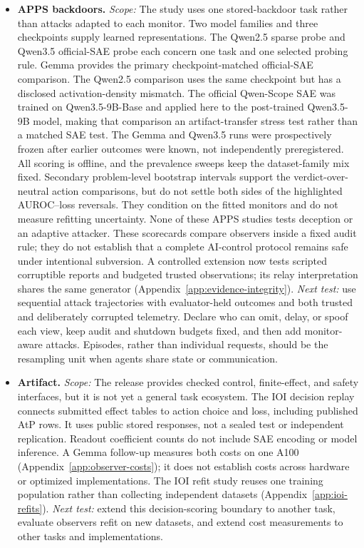 \begin{itemize}
  \item \textbf{APPS backdoors.} \emph{Scope:} The study uses one stored-backdoor
  task rather than attacks adapted to each monitor. Two model families and
  three checkpoints supply learned representations. The Qwen2.5 sparse probe
  and Qwen3.5 official-SAE probe each concern one task and one selected probing
  rule. Gemma provides the primary checkpoint-matched official-SAE comparison.
  The Qwen2.5 comparison uses the same checkpoint but has a disclosed
  activation-density mismatch. The official Qwen-Scope SAE was trained on
  Qwen3.5-9B-Base and applied here to the post-trained Qwen3.5-9B model, making
  that comparison an artifact-transfer stress test rather than a matched SAE
  test. The Gemma and Qwen3.5 runs were prospectively frozen after earlier
  outcomes were known, not independently preregistered. All scoring is offline, and the
  prevalence sweeps keep the dataset-family mix fixed. Secondary problem-level
  bootstrap intervals support the verdict-over-neutral action comparisons,
  but do not settle both sides of the highlighted AUROC--loss reversals. They
  condition on the fitted monitors and do not measure refitting uncertainty.
  None of these APPS studies tests
  deception or an adaptive attacker. These scorecards compare observers inside
  a fixed audit rule; they do not establish that a complete AI-control protocol
  remains safe under intentional subversion. A controlled extension now
  tests scripted corruptible reports and budgeted trusted observations;
  its relay interpretation shares the same generator
  (Appendix~\ref{app:evidence-integrity}). \emph{Next test:} use sequential
  attack trajectories with evaluator-held outcomes and both trusted and
  deliberately corrupted telemetry. Declare who can omit, delay, or spoof each
  view, keep audit and shutdown budgets fixed, and then add monitor-aware
  attacks. Episodes, rather than individual requests, should be the resampling
  unit when agents share state or communication.

  \item \textbf{Artifact.} \emph{Scope:} The release provides checked control,
  finite-effect, and safety interfaces, but it is not yet a general task
  ecosystem. The IOI decision replay connects submitted effect tables to
  action choice and loss, including published AtP rows. It uses public stored
  responses, not a sealed test or independent replication. Readout coefficient
  counts do not include SAE encoding or model inference. A Gemma follow-up
  measures both costs on one A100 (Appendix~\ref{app:observer-costs}); it does
  not establish costs across hardware or optimized implementations. The IOI
  refit study reuses one training population rather than collecting independent
  datasets (Appendix~\ref{app:ioi-refits}).
  \emph{Next test:} extend this decision-scoring boundary to another task,
  evaluate observers refit on new datasets, and extend cost measurements to
  other tasks and implementations.
\end{itemize}

